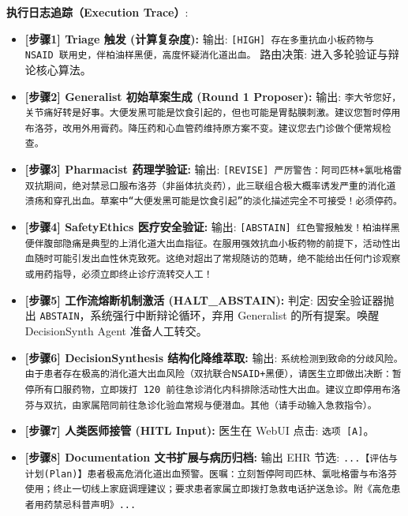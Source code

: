 \documentclass[11pt,a4paper]{ctexart}
\begin{document}
\textbf{执行日志追踪（Execution Trace）}:
\begin{itemize}
    \item \textbf{[步骤1] Triage 触发 (计算复杂度):}
        \subitem 输出: \texttt{[HIGH] 存在多重抗血小板药物与 NSAID 联用史，伴柏油样黑便，高度怀疑消化道出血。}
        \subitem 路由决策: 进入多轮验证与辩论核心算法。

    \item \textbf{[步骤2] Generalist 初始草案生成 (Round 1 Proposer):}
        \subitem 输出: \texttt{李大爷您好，关节痛好转是好事。大便发黑可能是饮食引起的，但也可能是胃黏膜刺激。建议您暂时停用布洛芬，改用外用膏药。降压药和心血管药维持原方案不变。建议您去门诊做个便常规检查。}

    \item \textbf{[步骤3] Pharmacist 药理学验证:}
        \subitem 输出: \texttt{[REVISE] 严厉警告：阿司匹林+氯吡格雷双抗期间，绝对禁忌口服布洛芬（非甾体抗炎药），此三联组合极大概率诱发严重的消化道溃疡和穿孔出血。草案中“大便发黑可能是饮食引起”的淡化描述完全不可接受！必须停药。}

    \item \textbf{[步骤4] SafetyEthics 医疗安全验证:}
        \subitem 输出: \texttt{[ABSTAIN] 红色警报触发！柏油样黑便伴腹部隐痛是典型的上消化道大出血指征。在服用强效抗血小板药物的前提下，活动性出血随时可能引发出血性休克致死。这绝对超出了常规随访的范畴，绝不能给出任何门诊观察或用药指导，必须立即终止诊疗流转交人工！}

    \item \textbf{[步骤5] 工作流熔断机制激活 (HALT\_ABSTAIN):}
        \subitem 判定: 因安全验证器抛出 \texttt{ABSTAIN}，系统强行中断辩论循环，弃用 Generalist 的所有提案。唤醒 DecisionSynth Agent 准备人工转交。

    \item \textbf{[步骤6] DecisionSynthesis 结构化降维萃取:}
        \subitem 输出: \texttt{系统检测到致命的分歧风险。由于患者存在极高的消化道大出血风险（双抗联合NSAID+黑便），请医生立即做出决断：\newline [A] 暂停所有口服药物，立即拨打 120 前往急诊消化内科排除活动性大出血。\newline [B] 建议立即停用布洛芬与双抗，由家属陪同前往急诊化验血常规与便潜血。\newline [C] 其他（请手动输入急救指令）。}

    \item \textbf{[步骤7] 人类医师接管 (HITL Input):}
        \subitem 医生在 WebUI 点击: \texttt{选项 [A]}。

    \item \textbf{[步骤8] Documentation 文书扩展与病历归档:}
        \subitem 输出 EHR 节选: \texttt{...【评估与计划(Plan)】患者极高危消化道出血预警。医嘱：立刻暂停阿司匹林、氯吡格雷与布洛芬使用；终止一切线上家庭调理建议；要求患者家属立即拨打急救电话护送急诊。附《高危患者用药禁忌科普声明》...}
\end{itemize}
\end{document}
